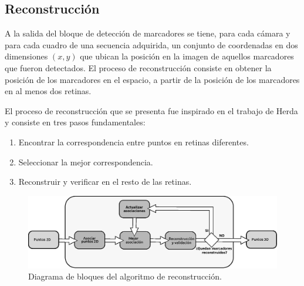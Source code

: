 \subsection{Reconstrucción}

A la salida del bloque de detección de marcadores se tiene, para cada cámara y para cada cuadro de una secuencia adquirida, un conjunto de coordenadas en dos dimensiones $(x,y)$ que ubican la posición en la imagen de aquellos marcadores que fueron detectados.
El proceso de reconstrucción consiste en obtener la posición de los marcadores en el espacio,  a partir de la posición de los marcadores en al menos dos retinas.
%
%

El proceso de reconstrucción que se presenta fue inspirado en el trabajo de Herda \cite{herda} y consiste en tres pasos fundamentales:
\begin{enumerate}
\item Encontrar la correspondencia entre puntos en retinas diferentes.
\item Seleccionar la mejor correspondencia.
\item Reconstruir y verificar en el resto de las retinas.
\end{enumerate}

\begin{figure}
	\begin{center}
		\includegraphics[scale=0.45]{./imagenes/Reconstruccion/bloques_reconstruccion}
		\caption{Diagrama de bloques del algoritmo de reconstrucción.}
		\label{fig: diagrama algoritmo}
	\end{center}
\end{figure}

